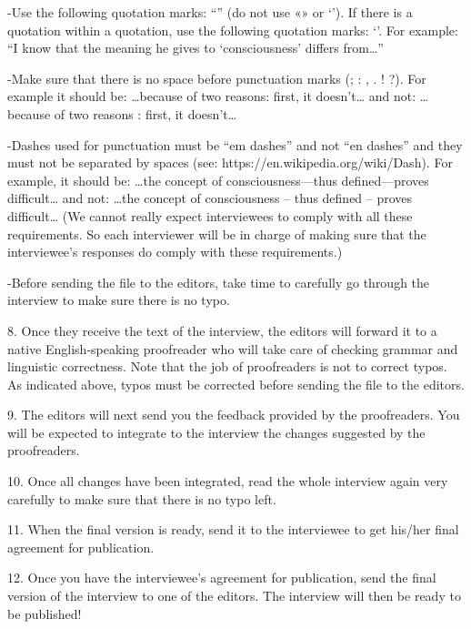\documentclass[11pt]{article}
\begin{document}
-Use the following quotation marks: “” (do not use «» or ‘’). If there is a quotation within a quotation, use the following quotation marks: ‘’. For example: “I know that the meaning he gives to ‘consciousness’ differs from…”\par

-Make sure that there is no space before punctuation marks (; : , . ! ?). For example it should be: …because of two reasons: first, it doesn’t… and not: …because of two reasons : first, it doesn’t…\par

-Dashes used for punctuation must be “em dashes” and not “en dashes” and they must not be separated by spaces (see: https://en.wikipedia.org/wiki/Dash). For example, it should be: …the concept of consciousness—thus defined—proves difficult… and not: …the concept of consciousness – thus defined – proves difficult…
(We cannot really expect interviewees to comply with all these requirements. So each interviewer will be in charge of making sure that the interviewee’s responses do comply with these requirements.)\par

-Before sending the file to the editors, take time to carefully go through the interview to make sure there is no typo.\par

8. Once they receive the text of the interview, the editors will forward it to a native English-speaking proofreader who will take care of checking grammar and linguistic correctness. Note that the job of proofreaders is not to correct typos. As indicated above, typos must be corrected before sending the file to the editors.\par

9. The editors will next send you the feedback provided by the proofreaders. You will be expected to integrate to the interview the changes suggested by the proofreaders.\par

10. Once all changes have been integrated, read the whole interview again very carefully to make sure that there is no typo left.\par

11. When the final version is ready, send it to the interviewee to get his/her final agreement for publication.\par

12. Once you have the interviewee’s agreement for publication, send the final version of the interview to one of the editors. The interview will then be ready to be published!\par
\end{document}
